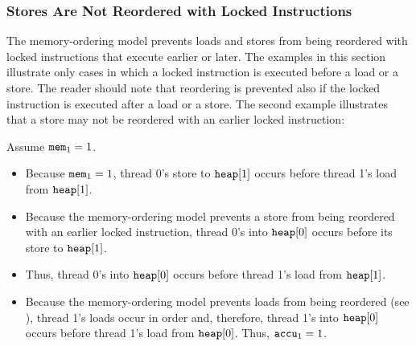 \newpage

\subsubsection*{Stores Are Not Reordered with Locked Instructions}

The memory-ordering model prevents loads and stores from being reordered with locked instructions that execute earlier or later.
The examples in this section illustrate only cases in which a locked instruction is executed before a load or a store.
The reader should note that reordering is prevented also if the locked instruction is executed after a load or a store.
\bigbreak
\noindent
The second example illustrates that a store may not be reordered with an earlier locked instruction:

\begin{table}[!hbt]
\noindent{}
\caption{Stores Are not Reordered with Locks \cite[Example 8-10]{ref:Intel}}
\label{tbl:litmus:intel:10}
\end{table}

\noindent
Assume $\texttt{mem}_1 = 1$.
\begin{itemize}
  \item Because $\texttt{mem}_1 = 1$, thread 0’s store to $\texttt{heap}[1]$ occurs before thread 1’s load from $\texttt{heap}[1]$.
  \item Because the memory-ordering model prevents a store from being reordered with an earlier locked instruction, thread 0’s  into $\texttt{heap}[0]$ occurs before its store to $\texttt{heap}[1]$.
  \item Thus, thread 0’s  into $\texttt{heap}[0]$ occurs before thread 1’s load from $\texttt{heap}[1]$.
  \item Because the memory-ordering model prevents loads from being reordered (see \cite[Section 8.2.3.2]{ref:Intel}), thread 1’s loads occur in order and, therefore, thread 1’s  into $\texttt{heap}[0]$ occurs before thread 1’s load from $\texttt{heap}[0]$. Thus, $\texttt{accu}_1 = 1$.
\end{itemize}

